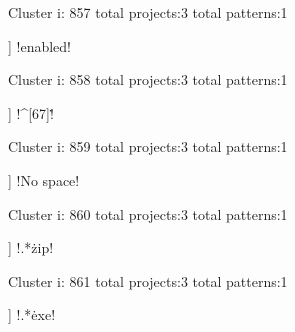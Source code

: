 Cluster i: 857
total projects:3
total patterns:1
\begin{multicols}{1}
\begin{description}[noitemsep,topsep=0pt]
\item [[3] ] \cverb!enabled!
\end{description}
\end{multicols}







Cluster i: 858
total projects:3
total patterns:1
\begin{multicols}{1}
\begin{description}[noitemsep,topsep=0pt]
\item [[3] ] \cverb!^[67]\.!
\end{description}
\end{multicols}







Cluster i: 859
total projects:3
total patterns:1
\begin{multicols}{1}
\begin{description}[noitemsep,topsep=0pt]
\item [[3] ] \cverb!No space!
\end{description}
\end{multicols}







Cluster i: 860
total projects:3
total patterns:1
\begin{multicols}{1}
\begin{description}[noitemsep,topsep=0pt]
\item [[3] ] \cverb!.*\.zip!
\end{description}
\end{multicols}







Cluster i: 861
total projects:3
total patterns:1
\begin{multicols}{1}
\begin{description}[noitemsep,topsep=0pt]
\item [[3] ] \cverb!.*\.exe!
\end{description}
\end{multicols}







